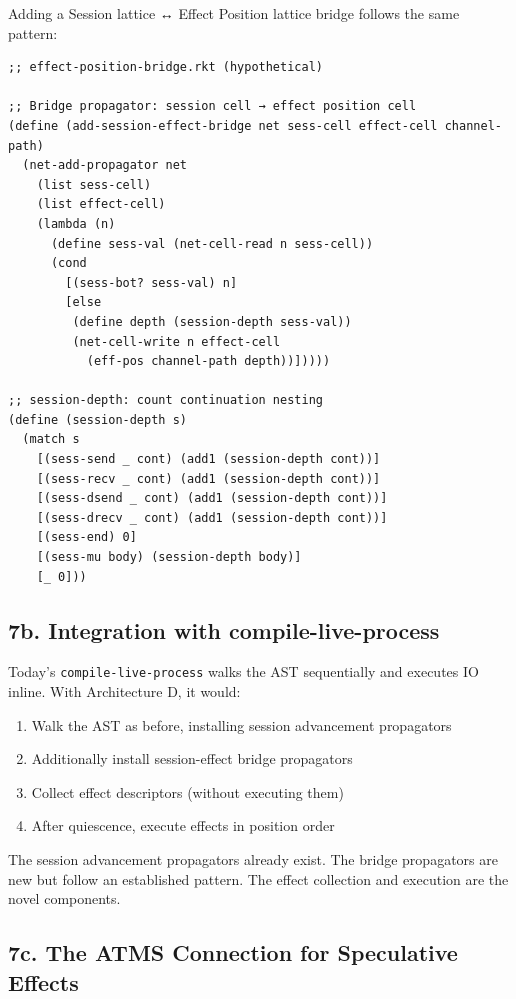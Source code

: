 \documentclass[11pt]{article}
\begin{document}
Adding a Session lattice ↔ Effect Position lattice bridge follows the same
pattern:

\begin{verbatim}
;; effect-position-bridge.rkt (hypothetical)

;; Bridge propagator: session cell → effect position cell
(define (add-session-effect-bridge net sess-cell effect-cell channel-path)
  (net-add-propagator net
    (list sess-cell)
    (list effect-cell)
    (lambda (n)
      (define sess-val (net-cell-read n sess-cell))
      (cond
        [(sess-bot? sess-val) n]
        [else
         (define depth (session-depth sess-val))
         (net-cell-write n effect-cell
           (eff-pos channel-path depth))]))))

;; session-depth: count continuation nesting
(define (session-depth s)
  (match s
    [(sess-send _ cont) (add1 (session-depth cont))]
    [(sess-recv _ cont) (add1 (session-depth cont))]
    [(sess-dsend _ cont) (add1 (session-depth cont))]
    [(sess-drecv _ cont) (add1 (session-depth cont))]
    [(sess-end) 0]
    [(sess-mu body) (session-depth body)]
    [_ 0]))
\end{verbatim}
\subsection{7b. Integration with compile-live-process}
\label{sec:orgc6b562c}

Today's \texttt{compile-live-process} walks the AST sequentially and executes IO inline.
With Architecture D, it would:

\begin{enumerate}
\item Walk the AST as before, installing session advancement propagators
\item Additionally install session-effect bridge propagators
\item Collect effect descriptors (without executing them)
\item After quiescence, execute effects in position order
\end{enumerate}

The session advancement propagators already exist. The bridge propagators are
new but follow an established pattern. The effect collection and execution
are the novel components.
\subsection{7c. The ATMS Connection for Speculative Effects}
\label{sec:org97d7fee}
\end{document}
